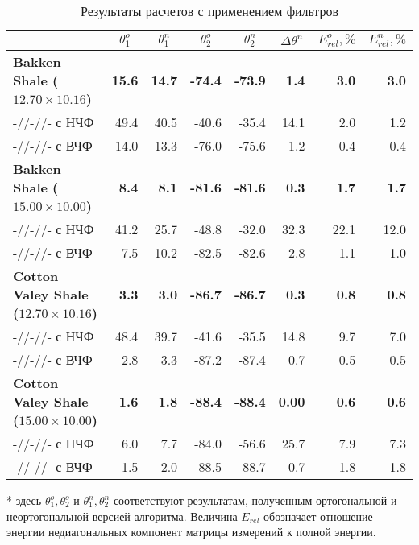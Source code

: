 \documentclass[a4paper,11pt]{article}
\begin{document}
\begin{table}[h]
\footnotesize
\centering
\caption{Результаты расчетов с применением фильтров}
\renewcommand{\arraystretch}{1.5}
\begin{tabularx}{\textwidth}{|X|rr|rr|r|rr|}
\hline
				&\multicolumn{1}{c}{$\theta_1^o$} & \multicolumn{1}{c|}{$\theta_1^n$} & \multicolumn{1}{c}{$\theta_2^o$} & \multicolumn{1}{c|}{$\theta_2^n$} & \multicolumn{1}{c|}{$\Delta\theta^n$}& \multicolumn{1}{c}{$E_{rel}^o, \%$} & \multicolumn{1}{c|}{$E_{rel}^n, \%$} \\ \hline
\hline	\textbf{Bakken Shale ($12.70 \times 10.16$)} & \textbf{15.6} & \textbf{14.7} & \textbf{-74.4}  & \textbf{-73.9}  & \textbf{1.4}  & \textbf{3.0} & \textbf{3.0} \\
		-//-//- с НЧФ & 49.4 & 40.5 & -40.6 & -35.4  & 14.1 & 2.0 & 1.2\\
		-//-//- с ВЧФ & 14.0 & 13.3 & -76.0 & -75.6  & 1.2 & 0.4 & 0.4\\
\hline	\textbf{Bakken Shale ($15.00 \times 10.00$)} & \textbf{8.4} & \textbf{8.1} & \textbf{-81.6}  & \textbf{-81.6} & \textbf{0.3}  & \textbf{1.7} & \textbf{1.7} \\
		-//-//- с НЧФ & 41.2 & 25.7 & -48.8 & -32.0  & 32.3 & 22.1 & 12.0\\
		-//-//- с ВЧФ & 7.5 & 10.2 & -82.5 & -82.6  & 2.8 & 1.1 & 1.0\\
\hline	\textbf{Cotton Valey Shale ($12.70 \times 10.16$)} & \textbf{3.3} & \textbf{3.0} & \textbf{-86.7}  & \textbf{-86.7}  & \textbf{0.3}  & \textbf{0.8} & \textbf{0.8}\\
		-//-//- с НЧФ & 48.4 & 39.7 & -41.6 & -35.5  & 14.8  & 9.7 & 7.0 \\
		-//-//- с ВЧФ & 2.8 & 3.3 & -87.2 & -87.4  & 0.7  & 0.5 & 0.5\\	
\hline	\textbf{Cotton Valey Shale ($15.00 \times 10.00$)} & \textbf{1.6} & \textbf{1.8} & \textbf{-88.4}  & \textbf{-88.4}  & \textbf{0.00}  & \textbf{0.6} & \textbf{0.6} \\
		-//-//- с НЧФ & 6.0 & 7.7 & -84.0 & -56.6  & 25.7  & 7.9 & 7.3 \\
		-//-//- с ВЧФ & 1.5 & 2.0 & -88.5 & -88.7  & 0.7  & 1.8 & 1.8\\		
\hline	
\end{tabularx} 
\begin{flushleft}
* здесь $\theta_1^o,\theta_2^o$ и $\theta_1^n,\theta_2^n$ соответствуют результатам, полученным ортогональной и неортогональной версией алгоритма. Величина $E_{rel}$ обозначает отношение энергии недиагональных компонент матрицы измерений к полной энергии.
\end{flushleft}
\label{tab:filter_process_results}
\renewcommand{\arraystretch}{1.0}
\end{table}
\end{document}
